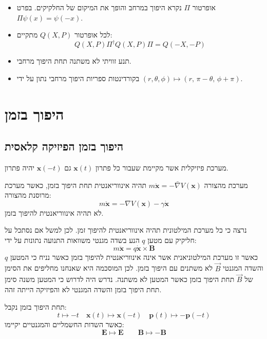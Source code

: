 \documentclass{tstextbook}
\begin{document}
\begin{summary}
  \begin{itemize}
    \item אופרטור \(\Pi\) נקרא היפוך במרחב והופך את המיקום של החלקיקים. בפרט \(\Pi \psi(x)=\psi(-x)\).
    \item לכל אופרטור \(Q(X,P)\) מתקיים:
$$Q(X,P)\Pi^{\dagger}Q(X,P)\Pi=Q(-X,-P)$$
    \item תנע זוויתי לא משתנה תחת היפוך מרחבי.
    \item בקורדינטות ספריות היפוך מרחבי נתון על ידי \(\left( r,\theta,\phi \right)\mapsto\left( r,\,\pi-\theta,\,\phi+\pi \right)\).
  \end{itemize}
\end{summary}
\section{היפוך בזמן}

\subsection{היפוך בזמן הפיזיקה קלאסית}

\begin{definition}
מערכת פיזיקלית אשר מקיימת שעבור כל פתרון \(\mathbf{x}(t)\) גם \(\mathbf{x}(-t)\) יהיה פתרון.

\end{definition}
\begin{example}
מערכת מהצורה \(m\ddot{\mathbf{x}}=-\bar{\nabla}V(\mathbf{x})\) תהיה אינווריאנטית תחת היפוך בזמן, כאשר מערכת מרוסנת מהצורה:
$$m{\ddot{\mathbf{x}}}=-\nabla V(\mathbf{x})-\gamma{\dot{\mathbf{x}}}$$
לא תהיה אינווריאנטית להיפוך בזמן.

\end{example}
\begin{remark}
נרצה כי כל מערכת המילטונית תהיה אינווריאנטית להיפוך זמן. לכן למשל אם נסתכל על חליקיק עם מטען \(q\) הנע בשדה מגנטי משוואות התנועה נתונות על ידי:
$$m{\ddot{\mathbf{x}}}=q{\dot{\mathbf{x}}}\times\mathbf{B}$$
כאשר זו מערכת המילטוניאנית אשר אינה אינווריאנטית להיפוך בזמן כאשר נניח כי המטען \(q\) והשדה המגנטי \(\vec{B}\) לא משתנים עם היפוך בזמן. לכן המוסכמה היא שאנחנו מחליפים את הסימן של \(\vec{B}\) תחת היפוך בזמן כאשר המטען לא משתנה. נדרש היה לדרוש כי המטען משנה סימן תחת היפוך בזמן והשדה המגנטי לא והפיזיקה הייתה זהה.

\end{remark}
\begin{corollary}
תחת היפוך בזמן נקבל:
$$t\mapsto-t\quad \mathbf{x}(t)\mapsto \mathbf{x}(-t)\quad \mathbf{p}(t)\mapsto-\mathbf{p}(-t)$$
כאשר השדות החשמליים והמגנטיים יקיימו:
$$\mathbf{E}\mapsto\mathbf{E}\qquad \mathbf{B}\mapsto-\mathbf{B}$$

\end{corollary}
\end{document}
